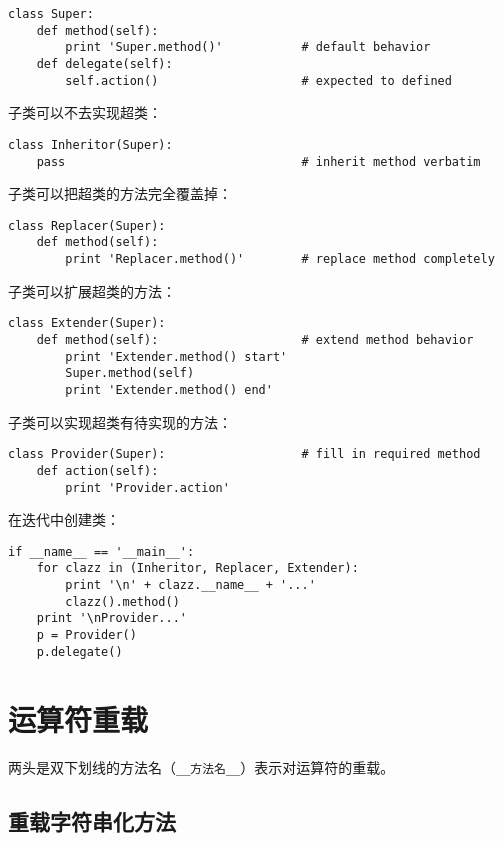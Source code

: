 \begin{lstlisting}
class Super:
	def method(self):
		print 'Super.method()'           # default behavior
	def delegate(self):
		self.action()                    # expected to defined
\end{lstlisting}

子类可以不去实现超类：

\begin{lstlisting}
class Inheritor(Super):
	pass                                 # inherit method verbatim
\end{lstlisting}

子类可以把超类的方法完全覆盖掉：

\begin{lstlisting}
class Replacer(Super):
	def method(self):
		print 'Replacer.method()'        # replace method completely
\end{lstlisting}

子类可以扩展超类的方法：

\begin{lstlisting}
class Extender(Super):
	def method(self):                    # extend method behavior
		print 'Extender.method() start'
		Super.method(self)
		print 'Extender.method() end'
\end{lstlisting}

子类可以实现超类有待实现的方法：
		
\begin{lstlisting}
class Provider(Super):                   # fill in required method
	def action(self):
		print 'Provider.action'
\end{lstlisting}

在迭代中创建类：

\begin{lstlisting}
if __name__ == '__main__':
	for clazz in (Inheritor, Replacer, Extender):
		print '\n' + clazz.__name__ + '...'
		clazz().method()
	print '\nProvider...'
	p = Provider()
	p.delegate()
\end{lstlisting}

\section{运算符重载}

两头是双下划线的方法名（\verb|__方法名__|）表示对运算符的重载。

\subsection{重载字符串化方法}

